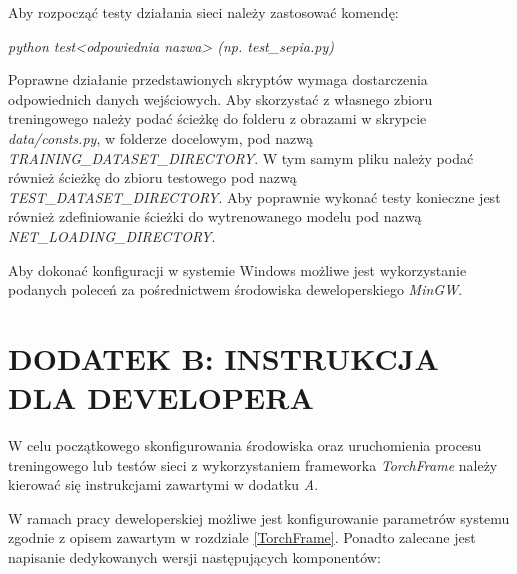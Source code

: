   \noindent
  Aby rozpocząć testy działania sieci należy zastosować komendę:

  \textit{python test<odpowiednia nazwa> (np. test\_sepia.py)}

  Poprawne działanie przedstawionych skryptów wymaga dostarczenia odpowiednich
  danych wejściowych. Aby skorzystać z własnego zbioru treningowego należy podać
  ścieżkę do folderu z obrazami w skrypcie \textit{data/consts.py}, w folderze docelowym,
  pod nazwą \textit{TRAINING\_DATASET\_DIRECTORY}. W tym samym pliku należy podać
  również ścieżkę do zbioru testowego pod nazwą \textit{TEST\_DATASET\_DIRECTORY}.
  Aby poprawnie wykonać testy konieczne jest również zdefiniowanie ścieżki do
  wytrenowanego modelu pod nazwą \textit{NET\_LOADING\_DIRECTORY}.

  Aby dokonać konfiguracji w systemie Windows możliwe jest wykorzystanie
  podanych poleceń za pośrednictwem środowiska deweloperskiego \textit{MinGW}.

\newpage
\section*{DODATEK B: INSTRUKCJA DLA DEVELOPERA}

  W celu początkowego skonfigurowania środowiska oraz uruchomienia procesu
  treningowego lub testów sieci z wykorzystaniem frameworka \textit{TorchFrame}
  należy kierować się instrukcjami zawartymi w dodatku \textit{A}.

  W ramach pracy deweloperskiej możliwe jest konfigurowanie parametrów systemu
  zgodnie z opisem zawartym w rozdziale \ref{TorchFrame}. Ponadto zalecane jest
  napisanie dedykowanych wersji następujących komponentów:

